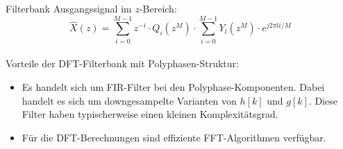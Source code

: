Filterbank Ausgangssignal im $z$-Bereich:
\[ \hat{X}(z) = \sum_{i=0}^{M-1}z^{-i} \cdot Q_i(z^M) \cdot \sum_{i=0}^{M-1}Y_l(z^M) \cdot e^{j2\pi li/M} \]
~\\
Vorteile der DFT-Filterbank mit Polyphasen-Struktur:
\begin{itemize}[noitemsep,topsep=3pt]
	\item Es handelt sich um FIR-Filter bei den Polyphase-Komponenten. Dabei handelt es sich um downgesampelte Varianten
	von $h[k]$ und $g[k]$. Diese Filter haben typischerweise einen kleinen Komplexitätsgrad. 
	\item Für die DFT-Berechnungen sind effiziente FFT-Algorithmen verfügbar.
\end{itemize}